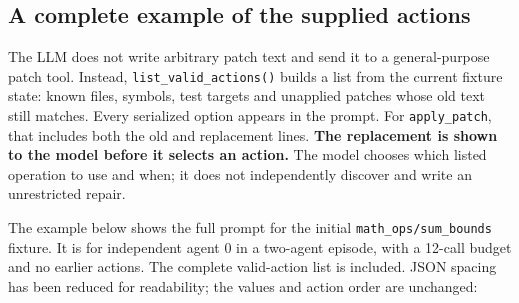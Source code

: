 \documentclass[12pt,a4paper,oneside]{report}
\begin{document}
\subsection{A complete example of the supplied actions}
The LLM does not write arbitrary patch text and send it to a general-purpose patch tool. Instead, \texttt{list\allowbreak\_valid\allowbreak\_actions()} builds a list from the current fixture state: known files, symbols, test targets and unapplied patches whose old text still matches. Every serialized option appears in the prompt. For \texttt{apply\allowbreak\_patch}, that includes both the old and replacement lines. \textbf{The replacement is shown to the model before it selects an action.} The model chooses which listed operation to use and when; it does not independently discover and write an unrestricted repair.

The example below shows the full prompt for the initial \texttt{math\allowbreak\_ops/sum\allowbreak\_bounds} fixture. It is for independent agent 0 in a two-agent episode, with a 12-call budget and no earlier actions. The complete valid-action list is included. JSON spacing has been reduced for readability; the values and action order are unchanged:
\end{document}
